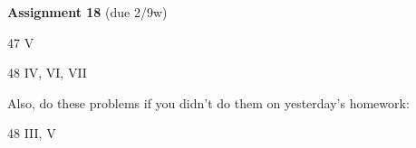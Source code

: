 \documentclass[12pt]{letter}
\begin{document}
\textbf{Assignment 18} (due 2/9w)


47 V

48 IV, VI, VII

Also, do these problems if you didn't do them on yesterday's homework:

48 III, V
\end{document}
